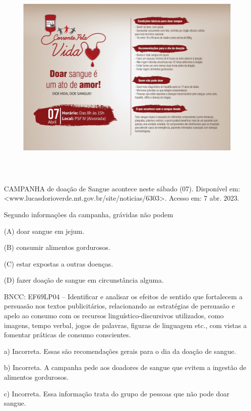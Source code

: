 \begin{itemize}
\begin{itemize}
{\begin{itemize}
\begin{itemize}
\begin{figure}
\centering
\includegraphics[width=5.90556in,height=4.16829in]{./_SAEB_9_POR/media/image22.png}
\caption{}
\end{figure}

CAMPANHA de doação de Sangue acontece neste sábado (07). Disponível em:
\textless{}www.lucasdorioverde.mt.gov.br/site/noticias/6303\textgreater{}.
Acesso em: 7 abr. 2023.

Segundo informações da campanha, grávidas não podem

(A) doar sangue em jejum.

(B) consumir alimentos gordurosos.

(C) estar expostas a outras doenças.

(D) fazer doação de sangue em circunstância alguma.

BNCC: EF69LP04 -- Identificar e analisar os efeitos de sentido que
fortalecem a persuasão nos textos publicitários, relacionando as
estratégias de persuasão e apelo ao consumo com os recursos
linguístico-discursivos utilizados, como imagens, tempo verbal, jogos de
palavras, figuras de linguagem etc., com vistas a fomentar práticas de
consumo conscientes.

a) Incorreta. Essas são recomendações gerais para o dia da doação de
sangue.

b) Incorreta. A campanha pede aos doadores de sangue que evitem a
ingestão de alimentos gordurosos.

c) Incorreta. Essa informação trata do grupo de pessoas que não pode
doar sangue.


\end{itemize}
\end{itemize}}
\end{itemize}
\end{itemize}
